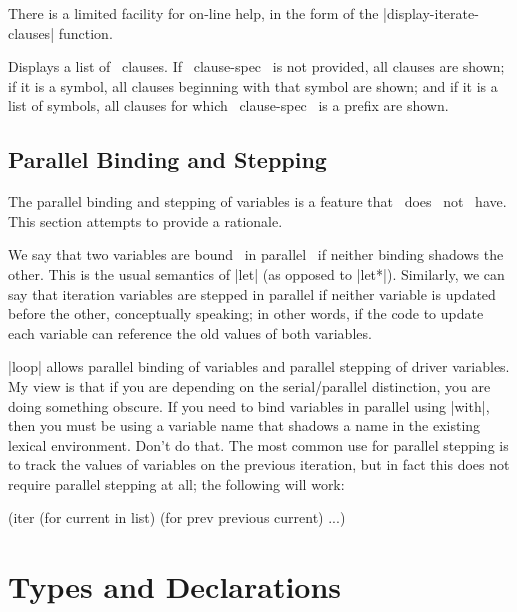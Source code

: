 \begin{sloppypar}
There is a limited facility for on-line help, in the form of the
|display-iterate-clauses| function.
\end{sloppypar}

\begin{clauses}

Displays a list of \iter\ clauses.  If ~clause-spec~ is not
provided, all clauses are shown; if it is a symbol, all clauses
beginning with that symbol are shown; and if it is a list of symbols,
all clauses for which ~clause-spec~ is a prefix are shown.

\end{clauses}

\subsection{Parallel Binding and Stepping}
\label{bindings}

The parallel binding and stepping of variables is a feature that
\iter\ does ~not~ have.  This section attempts to provide a rationale.

We say that two variables are bound ~in parallel~ if neither
binding shadows the other.  This is the usual semantics of |let|
(as opposed to |let*|).  Similarly, we can say that iteration
variables are stepped in parallel if neither variable is updated
before the other, conceptually speaking; in other words, if the code
to update each variable can reference the old values of both variables.

|loop| allows parallel binding of variables and parallel stepping of
driver variables.  My view is that if you are depending on the
serial/parallel distinction, you are doing something obscure.  If you
need to bind
variables in parallel using |with|, then you must be using a
variable name that shadows a name in the existing lexical environment.
Don't do that.  The most common use for parallel stepping is to track
the values of variables on the previous iteration, but in fact this
does not require parallel stepping at all; the following will work:
\begin{program}
(iter (for current in list)
      (for prev previous current)
      ...)
\end{program}


\section{Types and Declarations}
\label{types}

